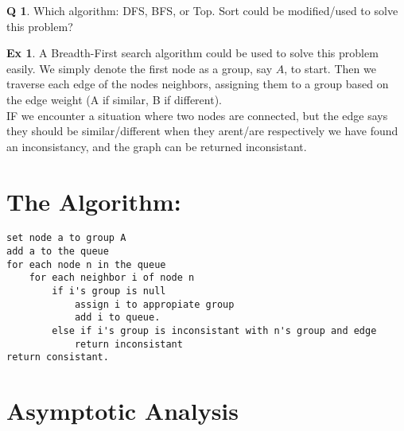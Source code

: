 \documentclass{book}
\theoremstyle{definition}
\newtheorem*{examp}{Ex}
\newtheorem{quest}{Q}
\begin{document}
	\begin{quest}
		Which algorithm: DFS, BFS, or Top. Sort could be modified/used to solve this problem?
		\begin{examp}
			A Breadth-First search algorithm could be used to solve this problem easily. We simply denote the first node
			as a group, say $A$, to start. Then we traverse each edge of the nodes neighbors, assigning them to a group
			based on the edge weight (A if similar, B if different).\\

			IF we encounter a situation where two nodes are connected, but the edge says they should be similar/different
			when they arent/are respectively we have found an inconsistancy, and the graph can be returned inconsistant.
		\end{examp}
	\end{quest}
\newpage
	\section*{The Algorithm:}
\begin{lstlisting}
set node a to group A
add a to the queue
for each node n in the queue
	for each neighbor i of node n
		if i's group is null
			assign i to appropiate group
			add i to queue.
		else if i's group is inconsistant with n's group and edge
			return inconsistant
return consistant.
\end{lstlisting}
	\section*{Asymptotic Analysis}
\end{document}
